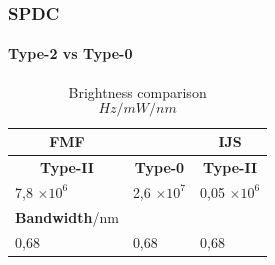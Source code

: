 \documentclass[serif,8pt]{beamer}
\begin{document}
{{\begin{frame}
	\frametitle{SPDC}
	\framesubtitle{Type-2 vs Type-0}
	\begin{table}
		\begin{center}
		\caption{Brightness comparison \[Hz/mW/nm\]}
			\begin{tabular}[c|c|c]{|ll|l|}
				\hline
				\multicolumn{1}{|c}{\hfill\textbf{FMF}\hfill} &&
				\multicolumn{1}{c|}{\textbf{IJS}} \\
				\hline
				\multicolumn{1}{|c|}{\textbf{Type-II}} &
				\multicolumn{1}{c|}{\textbf{Type-0}} &
				\multicolumn{1}{c|}{\textbf{Type-II}} \\
				\hline
				7,8 $\times10^6$ & 2,6 $\times 10^7 $ & 0,05 $\times 10^6$ \\
				\hline
				\multicolumn{1}{|c}{\textbf{Bandwidth}/nm} &\multicolumn{1}{c}{ } & \multicolumn{1}{c|}{ }  \\
				\hline
				0,68 & 0,68 & 0,68\\
				\hline
			\end{tabular}
		\end{center}
	\end{table}
\end{frame}




}}
\end{document}
